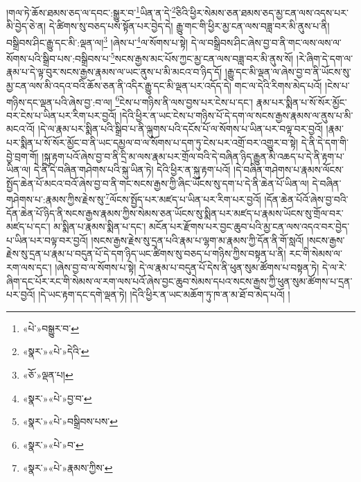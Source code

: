 །གལ་ཏེ་ཆོས་ཐམས་ཅད་ལ་དབང་:སྒྱུར་བ་\footnote{«པེ་»བསྒྱུར་བ་}ཡིན་ན་དེ་\footnote{«སྣར་»«པེ་»དེའི་}ཅིའི་ཕྱིར་སེམས་ཅན་ཐམས་ཅད་མྱ་ངན་ལས་འདས་པར་མི་བྱེད་ཅེ་ན། དེ་ཚིགས་སུ་བཅད་པས་སྟོན་པར་བྱེད་དེ། རྒྱུ་གང་གི་ཕྱིར་མྱ་ངན་ལས་བཟླ་བར་མི་ནུས་པ་ནི། བསྒྲིབས་ཤིང་རྒྱུ་དང་མི་:ལྡན་ལ།\footnote{«ཅོ་»ལྡན་པ།} །ཞེས་པ་\footnote{«སྣར་»«པེ་»བྱ་བ་}ལ་སོགས་པ་སྟེ། དེ་ལ་བསྒྲིབས་ཤིང་ཞེས་བྱ་བ་ནི་གང་ལས་ལས་ལ་སོགས་པའི་སྒྲིབ་པས་:བསྒྲིབས་པ་\footnote{«སྣར་»«པེ་»བསྒྲིབས་པས་}སངས་རྒྱས་མང་པོས་ཀྱང་མྱ་ངན་ལས་བཟླ་བར་མི་ནུས་སོ། །རེ་ཞིག་དེ་དག་ལ་རྣམ་པ་དེ་ལྟ་བུར་སངས་རྒྱས་རྣམས་ལ་ཡང་ནུས་པ་མི་མངའ་བ་ཉིད་དོ། །རྒྱུ་དང་མི་ལྡན་ལ་ཞེས་བྱ་བ་ནི་ཡོངས་སུ་མྱ་ངན་ལས་མི་འདའ་བའི་ཆོས་ཅན་ནི་འདིར་རྒྱུ་དང་མི་ལྡན་པར་འདོད་དེ། གང་ལ་དེའི་རིགས་མེད་པའོ། །ངེས་པ་གཉིས་དང་ལྡན་པའི་ཞེས་བྱ་:བ་ལ། \footnote{«སྣར་»«པེ་»བ་}ངེས་པ་གཉིས་ནི་ལས་བྱས་པར་ངེས་པ་དང་། རྣམ་པར་སྨིན་པ་སོ་སོར་མྱོང་བར་ངེས་པ་ཡིན་པར་རིག་པར་བྱའོ། །དེའི་ཕྱིར་ན་ཡང་ངེས་པ་གཉིས་པོ་དེ་དག་ལ་སངས་རྒྱས་རྣམས་ལ་ནུས་པ་མི་མངའ་འོ། །དེ་ལ་རྣམ་པར་སྨིན་པའི་སྒྲིབ་པ་ནི་ལྐུགས་པའི་དངོས་པོ་ལ་སོགས་པ་ཡིན་པར་བལྟ་བར་བྱའོ། །རྣམ་པར་སྨིན་པ་སོ་སོར་མྱོང་བ་ནི་ཡང་དམྱལ་བ་ལ་སོགས་པ་དག་ཏུ་ངེས་པར་འགྲོ་བར་འགྱུར་བ་སྟེ། དེ་ནི་དེ་དག་གི་བྱེ་བྲག་གོ། །སྐུ་རྟག་པའོ་ཞེས་བྱ་བ་ནི་དྲི་མ་ལས་རྣམ་པར་གྲོལ་བའི་དེ་བཞིན་ཉིད་རྒྱུན་མི་འཆད་པ་དེ་ནི་རྟག་པ་ཡིན་ལ། དེ་ནི་དེ་བཞིན་གཤེགས་པའི་སྐུ་ཡིན་ཏེ། དེའི་ཕྱིར་ན་སྐུ་རྟག་པའོ། །དེ་བཞིན་གཤེགས་པ་རྣམས་ལོངས་སྤྱོད་ཆེན་པོ་མངའ་བའོ་ཞེས་བྱ་བ་ནི་གང་སངས་རྒྱས་ཀྱི་ཞིང་ཡོངས་སུ་དག་པ་དེ་ནི་ཆེན་པོ་ཡིན་ལ། དེ་བཞིན་གཤེགས་པ་:རྣམས་ཀྱིས་རྗེས་སུ་\footnote{«སྣར་»«པེ་»རྣམས་ཀྱིས་}ལོངས་སྤྱོད་པར་མཛད་པ་ཡིན་པར་རིག་པར་བྱའོ། །དོན་ཆེན་པོའོ་ཞེས་བྱ་བའི་དོན་ཆེན་པོ་ཉིད་ནི་སངས་རྒྱས་རྣམས་ཀྱིས་སེམས་ཅན་ཡོངས་སུ་སྨིན་པར་མཛད་པ་རྣམས་ཡོངས་སུ་གྲོལ་བར་མཛད་པ་དང་། མ་སྨིན་པ་རྣམས་སྨིན་པ་དང་། མངོན་པར་རྫོགས་པར་བྱང་ཆུབ་པའི་མྱ་ངན་ལས་འདའ་བར་བྱེད་པ་ཡིན་པར་བལྟ་བར་བྱའོ། །སངས་རྒྱས་རྗེས་སུ་དྲན་པའི་རྣམ་པ་ལྷག་མ་རྣམས་ཀྱི་དོན་ནི་གོ་སླའོ། །སངས་རྒྱས་རྗེས་སུ་དྲན་པ་རྣམ་པ་བདུན་པོ་དེ་དག་ཉིད་ཡང་ཚིགས་སུ་བཅད་པ་གཉིས་ཀྱིས་བསྟན་པ་ནི། རང་གི་སེམས་ལ་རག་ལས་དང་། །ཞེས་བྱ་བ་ལ་སོགས་པ་སྟེ། དེ་ལ་རྣམ་པ་བདུན་པོ་དེས་ནི་ཕུན་སུམ་ཚོགས་པ་བསྟན་ཏེ། དེ་ལ་རེ་ཞིག་དང་པོར་རང་གི་སེམས་ལ་རག་ལས་པའོ་ཞེས་བྱང་ཆུབ་སེམས་དཔའ་སངས་རྒྱས་ཀྱི་ཕུན་སུམ་ཚོགས་པ་དྲན་པར་བྱའོ། །དེ་ཡང་རྟག་དང་དགེ་ལྡན་ཏེ། །དེའི་ཕྱིར་ན་ཡང་མཆོག་ཏུ་ཁ་ན་མ་ཐོ་བ་མེད་པའོ། །
